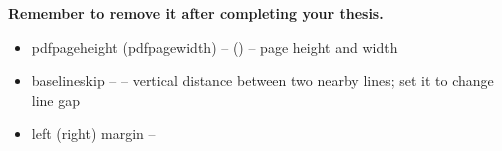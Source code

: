 \textbf{Remember to remove it after completing your thesis.}

\begin{itemize}
    \item pdfpageheight (pdfpagewidth) -- \the\pdfpagewidth (\the\pdfpageheight) -- page height and width
    \item baselineskip -- \the\baselineskip -- vertical distance between two
	nearby lines; set it to change line gap
    \item left (right) margin -- 

\end{itemize}
